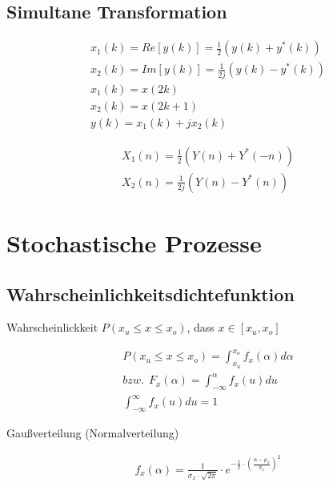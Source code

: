 \documentclass[10pt,a4paper]{article}
\begin{document}
  \subsection{Simultane Transformation}
  \begin{mdframed}[style=exercise]
    \begin{align}
        x_1(k) = Re[y(k)] = \frac{1}{2}(y(k)+y^*(k))\\
        x_2(k) = Im[y(k)] = \frac{1}{2j}(y(k)-y^*(k))\\
        x_1(k) = x(2k)\\
        x_2(k) = x(2k+1)\\
        y(k) = x_1(k) +jx_2(k)
    \end{align}
  \end{mdframed}
  \begin{mdframed}[style=exercise]
    \begin{align}
        X_1(n) = \frac{1}{2}(Y(n)+Y^*(-n))\\
        X_2(n) = \frac{1}{2j}(Y(n)-Y^*(n))
    \end{align}
  \end{mdframed}

\section{Stochastische Prozesse}
\subsection{Wahrscheinlichkeitsdichtefunktion}
Wahrscheinlickkeit $P(x_u \leq x \leq x_o )$, dass $x \in [x_u,x_o]$ 
  \begin{mdframed}[style=exercise]
    \begin{align}
        P(x_u \leq x \leq x_o ) = \displaystyle\int_{x_u}^{x_o} f_x(\alpha) d\alpha \\
        bzw. \ \ F_x(\alpha) = \displaystyle\int_{-\infty}^{\alpha} f_x(u)du\\
        \displaystyle\int_{-\infty}^{\infty} f_x(u)du = 1
    \end{align}
  \end{mdframed}
Gaußverteilung (Normalverteilung)
  \begin{mdframed}[style=exercise]
    \begin{align}
        f_x(\alpha) = \frac{1}{\sigma_x \cdot \sqrt{2\pi}} \cdot e^{-\frac{1}{2} \cdot \left( \frac{\alpha - \mu_x}{\sigma_x}\right)^2}
    \end{align}
  \end{mdframed}
\end{document}
